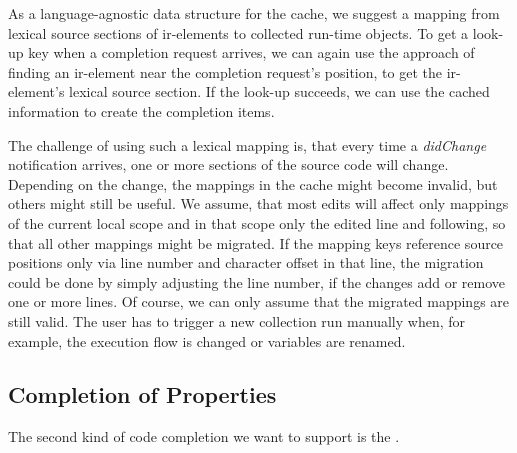 \documentclass[sigplan,10pt,review,anonymous]{acmart}
\begin{document}
    As a language-agnostic data structure for the cache, we suggest a mapping from lexical source sections of \ac{ir}-elements to collected run-time objects. To get a look-up key when a completion request arrives, we can again use the approach of finding an \ac{ir}-element near the completion request's position, to get the \ac{ir}-element's lexical source section. If the look-up succeeds, we can use the cached information to create the completion items.

    The challenge of using such a lexical mapping is, that every time a \emph{didChange} notification arrives, one or more sections of the source code will change. Depending on the change, the mappings in the cache might become invalid, but others might still be useful. We assume, that most edits will affect only mappings of the current local scope and in that scope only the edited line and following, so that all other mappings might be migrated. If the mapping keys reference source positions only via line number and character offset in that line, the migration could be done by simply adjusting the line number, if the changes add or remove one or more lines. Of course, we can only assume that the migrated mappings are still valid. The user has to trigger a new collection run manually when, for example, the execution flow is changed or variables are renamed.

\subsection{Completion of Properties}
    \label{sec:newApproachCompletionProperties}
    The second kind of code completion we want to support is the \completionOfProperties.
    
\end{document}
